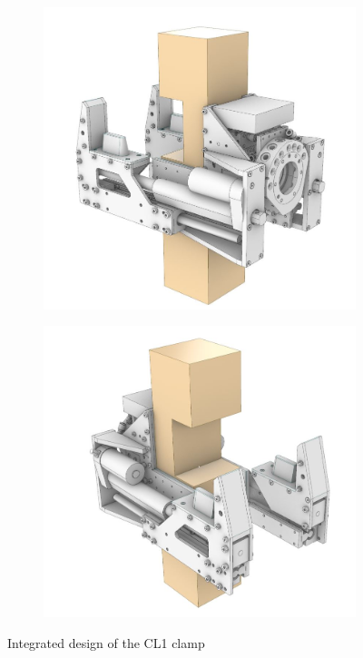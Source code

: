 \begin{figure}
    \centering
    \begin{subfigure}[b]{0.49\textwidth}
        \centering
        \includegraphics[width=\textwidth]{images/04-3/CL1_back.jpg}
    \end{subfigure}
    \hfill
    \begin{subfigure}[b]{0.49\textwidth}
        \centering
        \includegraphics[width=\textwidth]{images/04-3/CL1_front.jpg}
    \end{subfigure}
    \caption{Integrated design of the CL1 clamp}
    \label{fig:integrated-cl1-hardware}
\end{figure}

